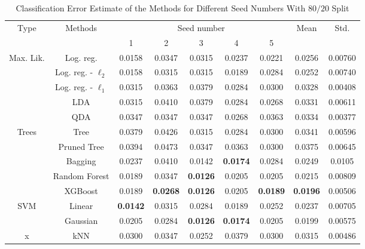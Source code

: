 \begin{table}[htb]
	\caption{Classification Error Estimate of the Methods for Different Seed Numbers With $80/20$ Split}
	\begin{center}
		\begin{tabular}{@{} c c c  c c c c c c @{}}\toprule
			\multirow{2}{*}{Type} & \multirow{2}{*}{Methods} &  \multicolumn{5}{c}{Seed number}
			& 	\multirow{2}{*}{Mean} & \multirow{2}{*}{Std.} \\
			& & 1 & 2 & 3 & 4 & 5 & & \\
			\midrule
			\multirow{5}{*}{Max. Lik.} & Log. reg. & \num{0.0158} & \num{0.0347} & \num{0.0315} & \num{0.0237} & \num{0.0221} & \num{0.0256} & \num{0.00760} \\
			& Log. reg. - $\ell_2$ & \num{0.0158} & \num{0.0315} & \num{0.0315} & \num{0.0189} & \num{0.0284} & \num{0.0252} & \num{0.00740}\\
			& Log. reg. - $\ell_1$ & \num{0.0315} & \num{0.0363} & \num{0.0379} & \num{0.0284} & \num{0.0300} & \num{0.0328} & \num{0.00408}\\
			& LDA & \num{0.0315} & \num{0.0410} & \num{0.0379} & \num{0.0284} & \num{0.0268} & \num{0.0331} & \num{0.00611}\\
			& QDA & \num{0.0347} & \num{0.0347} & \num{0.0347} & \num{0.0268} & \num{0.0363} & \num{0.0334} & \num{0.00377}\\
			\cmidrule{1-9}
			\multirow{5}{*}{Trees} & Tree & \num{0.0379} & \num{0.0426} & \num{0.0315} & \num{0.0284} & \num{0.0300} &  \num{0.0341} & \num{0.00596}\\
			& Pruned Tree & \num{0.0394} & \num{0.0473} & \num{0.0347} & \num{0.0363} & \num{0.0300} & \num{0.0375} & \num{0.00645}\\  
			& Bagging & \num{0.0237} & \num{0.0410} & \num{0.0142} & \textbf{\num{0.0174}} & \num{0.0284} & \num{0.0249} & \num{0.0105}\\
			& Random Forest & \num{0.0189} & \num{0.0347} & \textbf{\num{0.0126}} & \num{0.0205} & \num{0.0205} & \num{0.0215}  & \num{0.00809}\\
			& XGBoost & \num{0.0189} & \textbf{\num{0.0268}} & \textbf{\num{0.0126}} & \num{0.0205} & \textbf{\num{0.0189}} & \textbf{\num{0.0196}}  & \num{0.00506}\\
			\cmidrule{1-9}
			\multirow{2}{*}{SVM} & Linear & \textbf{\num{0.0142}} & \num{0.0315} & \num{0.0284} & \num{0.0189} & \num{0.0252} & \num{0.0237}  & \num{0.00705}\\
			& Gaussian & \num{0.0205} & \num{0.0284} & \textbf{\num{0.0126}} & \textbf{\num{0.0174}} & \num{0.0205} & \num{0.0199} & \num{0.00575}\\
			\cmidrule{1-9}
			x & kNN & \num{0.0300} & \num{0.0347} & \num{0.0252} & \num{0.0379} & \num{0.0300}& \num{0.0315}  & \num{0.00486} \\
			\bottomrule
			\end{tabular}
			\end{center}
			\label{tab_res_naive}
\end{table}

